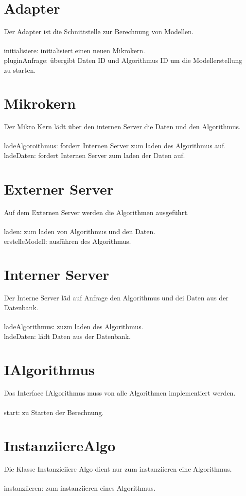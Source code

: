 \documentclass{book}
\begin{document}
\section{Adapter}
Der Adapter ist die Schnittstelle zur Berechnung von Modellen.\\
\\
initialisiere: initialisiert einen neuen Mikrokern.\\
pluginAnfrage: übergibt Daten ID und Algorithmus ID um die Modellerstellung zu starten.

\section{Mikrokern}
Der Mikro Kern lädt über den internen Server die Daten und den Algorithmus.\\
\\
ladeAlgoroithmus: fordert Internen Server zum laden des Algorithmus auf.\\
ladeDaten: fordert Internen Server zum laden der Daten auf.

\section{Externer Server}
Auf dem Externen Server werden die Algorithmen ausgeführt.\\
\\
laden: zum laden von Algorithmus und den Daten.\\
erstelleModell: ausführen des Algorithmus.
 
\section{Interner Server}
Der Interne Server läd auf Anfrage den Algorithmus und dei Daten aus der Datenbank.\\
\\
ladeAlgorithmus: zuzm laden des Algorithmus.\\
ladeDaten: lädt Daten aus der Datenbank.

\section{IAlgorithmus}
Das Interface IAlgorithmus muss von alle Algorithmen implementiert werden.\\
\\
start: zu Starten der Berechnung.

\section{InstanziiereAlgo}
Die Klasse Instanzieiiere Algo dient nur zum instanziieren eine Algorithmus.\\
\\
instanziieren: zum instanziieren eines Algorithmus.
\end{document}
